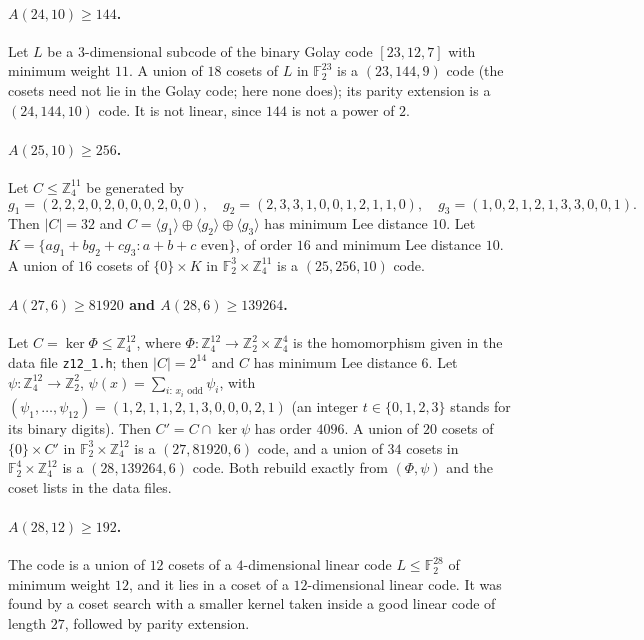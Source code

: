 \documentclass[11pt]{article}
\newcommand{\F}{\mathbb{F}_2}
\newcommand{\Z}{\mathbb{Z}_4}
\begin{document}
\paragraph{$A(24,10)\ge144$.} Let $L$ be a $3$-dimensional subcode of the binary Golay code $[23,12,7]$ with minimum
weight $11$. A union of $18$ cosets of $L$ in $\F^{23}$ is a $(23,144,9)$ code (the cosets need not lie in the Golay code; here
none does); its
parity extension is a $(24,144,10)$ code. It is not linear, since $144$ is not a power of $2$.

\paragraph{$A(25,10)\ge256$.} Let $C\le\Z^{11}$ be generated by
\[
g_1=(2,2,2,0,2,0,0,0,2,0,0),\quad g_2=(2,3,3,1,0,0,1,2,1,1,0),\quad g_3=(1,0,2,1,2,1,3,3,0,0,1).
\]
Then $|C|=32$ and $C=\langle g_1\rangle\oplus\langle g_2\rangle\oplus\langle g_3\rangle$ has minimum Lee distance $10$.
Let $K=\{ag_1+bg_2+cg_3: a+b+c \text{ even}\}$, of order $16$ and minimum Lee distance $10$. A union of $16$ cosets of
$\{0\}\times K$ in $\F^3\times\Z^{11}$ is a $(25,256,10)$ code.

\paragraph{$A(27,6)\ge81920$ and $A(28,6)\ge139264$.} Let $C=\ker\Phi\le\Z^{12}$, where
$\Phi:\Z^{12}\to\mathbb{Z}_2^2\times\Z^4$ is the homomorphism given in the data file \texttt{z12\_1.h}; then $|C|=2^{14}$ and
$C$ has minimum Lee distance $6$. Let $\psi:\Z^{12}\to\mathbb{Z}_2^2$, $\psi(x)=\sum_{i:\,x_i\text{ odd}}\psi_i$, with
$(\psi_1,\dots,\psi_{12})=(1,2,1,1,2,1,3,0,0,0,2,1)$ (an integer $t\in\{0,1,2,3\}$ stands for its binary digits). Then
$C'=C\cap\ker\psi$ has order $4096$. A union of $20$ cosets of $\{0\}\times C'$ in $\F^3\times\Z^{12}$ is a
$(27,81920,6)$ code, and a union of $34$ cosets in $\F^4\times\Z^{12}$ is a $(28,139264,6)$ code. Both rebuild exactly from
$(\Phi,\psi)$ and the coset lists in the data files.

\paragraph{$A(28,12)\ge192$.} The code is a union of $12$ cosets of a $4$-dimensional linear code $L\le\F^{28}$ of
minimum weight $12$, and it lies in a coset of a $12$-dimensional linear code. It was found by a coset search with a
smaller kernel taken inside a good linear code of length $27$, followed by parity extension.
\end{document}
